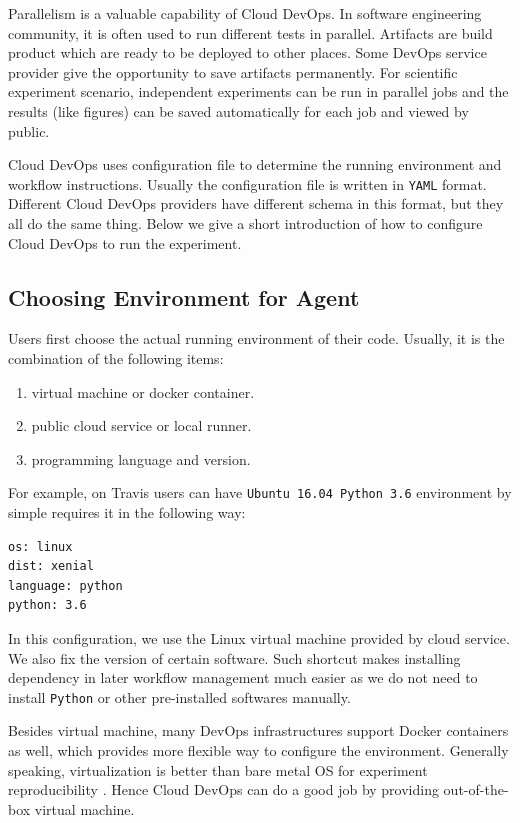 \documentclass{IEEEcsmag}
\begin{document}
Parallelism is a valuable capability of Cloud DevOps. In software engineering community, it is often used to run different tests in parallel.
Artifacts are build product which are ready to be deployed to other places.
Some DevOps service provider give the opportunity to save artifacts permanently. For scientific experiment scenario, independent experiments can be run in parallel jobs and the results (like figures) can be saved automatically for each job and viewed by public.

Cloud DevOps uses configuration file to determine the running environment and workflow instructions. 
Usually the configuration file is written in \texttt{YAML} format. Different Cloud DevOps providers have different schema in this format, but they all do the same thing. Below we give a short introduction of how to configure Cloud DevOps to run the experiment.
\subsection{Choosing Environment for Agent}
Users first choose the actual running environment of their code. Usually, it is the combination of the following items:
\begin{enumerate}
\item virtual machine or docker container.
\item public cloud service or local runner.
\item programming language and version.
\end{enumerate}

For example, on Travis users can have  \texttt{Ubuntu 16.04 Python 3.6} environment by simple requires it in the following way:
\begin{lstlisting}[caption={environment configuration}]
os: linux
dist: xenial
language: python
python: 3.6
\end{lstlisting}

In this configuration, we use the Linux virtual machine provided by cloud service. We also fix the version of certain software. 
Such shortcut makes installing dependency in later workflow management much easier as we do not need to install \texttt{Python} or other pre-installed softwares manually.

Besides virtual machine, many DevOps infrastructures support Docker containers as well, which provides more flexible way to configure the environment. Generally speaking, virtualization is better than bare metal OS for experiment reproducibility \cite{Howe12}. Hence Cloud DevOps can do a good job by providing out-of-the-box virtual machine.
\end{document}
